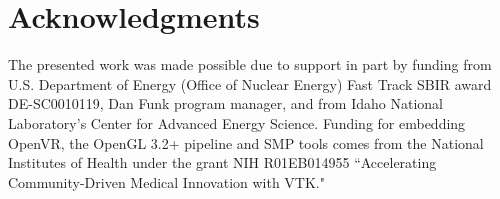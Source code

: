 \section*{Acknowledgments}

The presented work was made possible due to support in part by funding from U.S. Department of Energy (Office of Nuclear Energy) Fast Track SBIR award DE-SC0010119, Dan Funk program manager, and from Idaho National Laboratory's Center for Advanced Energy Science. Funding for embedding OpenVR, the OpenGL 3.2+ pipeline and SMP tools comes from the National Institutes of Health under the grant NIH R01EB014955 ``Accelerating Community-Driven Medical Innovation with VTK."
